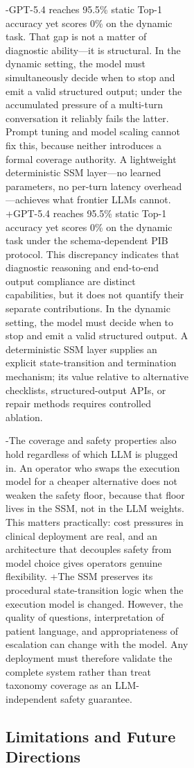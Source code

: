 \begin{figure}[t]
{\begin{figure}[!t]
{\begin{figure}[!t]
{-GPT-5.4 reaches 95.5\% static Top-1 accuracy yet scores 0\% on the dynamic task. That gap is not a matter of diagnostic ability---it is structural. In the dynamic setting, the model must simultaneously decide when to stop and emit a valid structured output; under the accumulated pressure of a multi-turn conversation it reliably fails the latter. Prompt tuning and model scaling cannot fix this, because neither introduces a formal coverage authority. A lightweight deterministic SSM layer---no learned parameters, no per-turn latency overhead---achieves what frontier LLMs cannot.
+GPT-5.4 reaches 95.5\% static Top-1 accuracy yet scores 0\% on the dynamic task under the schema-dependent PIB protocol. This discrepancy indicates that diagnostic reasoning and end-to-end output compliance are distinct capabilities, but it does not quantify their separate contributions. In the dynamic setting, the model must decide when to stop and emit a valid structured output. A deterministic SSM layer supplies an explicit state-transition and termination mechanism; its value relative to alternative checklists, structured-output APIs, or repair methods requires controlled ablation.
 
-The coverage and safety properties also hold regardless of which LLM is plugged in. An operator who swaps the execution model for a cheaper alternative does not weaken the safety floor, because that floor lives in the SSM, not in the LLM weights. This matters practically: cost pressures in clinical deployment are real, and an architecture that decouples safety from model choice gives operators genuine flexibility.
+The SSM preserves its procedural state-transition logic when the execution model is changed. However, the quality of questions, interpretation of patient language, and appropriateness of escalation can change with the model. Any deployment must therefore validate the complete system rather than treat taxonomy coverage as an LLM-independent safety guarantee.
 
 \subsection{Limitations and Future Directions}
 
}
\end{figure}}
\end{figure}}
\end{figure}
